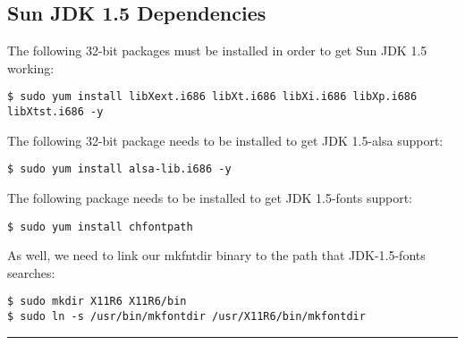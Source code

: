 \subsection{Sun JDK 1.5 Dependencies}
The following 32-bit packages must be installed in order to get Sun JDK 1.5 working:
\begin{snugshade}\begin{lstlisting}
$ sudo yum install libXext.i686 libXt.i686 libXi.i686 libXp.i686 libXtst.i686 -y
\end{lstlisting}\end{snugshade}\noindent
The following 32-bit package needs to be installed to get JDK 1.5-alsa support:
\begin{snugshade}\begin{lstlisting}
$ sudo yum install alsa-lib.i686 -y
\end{lstlisting}\end{snugshade}\noindent
The following package needs to be installed to get JDK 1.5-fonts support:
\begin{snugshade}\begin{lstlisting}
$ sudo yum install chfontpath 
\end{lstlisting}\end{snugshade}\noindent
As well, we need to link our mkfntdir binary to the path that JDK-1.5-fonts searches:
\begin{snugshade}\begin{lstlisting}
$ sudo mkdir X11R6 X11R6/bin
$ sudo ln -s /usr/bin/mkfontdir /usr/X11R6/bin/mkfontdir
\end{lstlisting}\end{snugshade}\noindent

\hrule

